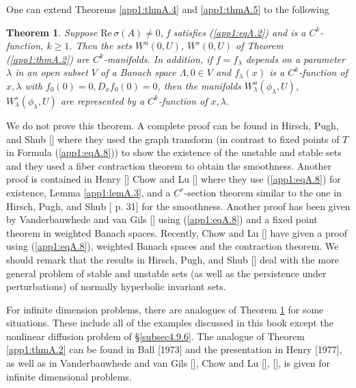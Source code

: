 \documentclass{surv-l}
\theoremstyle{plain}
\newtheorem{theorem}{Theorem}[section]
\theoremstyle{definition}
\numberwithin{equation}{section}
\numberwithin{figure}{chapter}
\begin{document}
One can extend Theorems \ref{app1:thmA.4} and \ref{app1:thmA.5} to the following

\begin{theorem}\label{app1:thmA.6}
Suppose $\mathrm{Re}\,\sigma(A)\neq 0$, f satisfies \emph{(\ref{app1:eqA.2})} and is a $C^{k}$-function, $k\geq 1$. Then the sets $W^{u}(0, U)$, $W^{s}(0, U)$ of Theorem \emph{(\ref{app1:thmA.2})} are $C^{k}$-manifolds. In addition, if $f=f_{\lambda}$ depends on a parameter $\lambda$ in an open subset $V$ of a Banach space $\Lambda, 0\in V$ and $f_{\lambda}(x)$ is a $C^{k}$-function of $x,\lambda$ with $f_{0}(0)=0,D_{x}f_{0}(0)=0$, then the manifolds $W_{\lambda}^{u}(\phi_{\lambda}, U)$, $W_{\lambda}^{s}(\phi_{\lambda}, U)$ are represented by a $C^{k}$-function of $x,\lambda$.
\end{theorem}

We do not prove this theorem. A complete proof can be found in Hirsch, Pugh, and Shub [\citeyear{1977hps}] where they used the graph transform (in contrast to fixed points of $T$ in Formula (\ref{app1:eqA.8})) to show the existence of the unstable and stable sets and they used a fiber contraction theorem to obtain the smoothness. Another proof is contained in Henry [\citeyear{1983h}] Chow and Lu [\citeyear{1988acl}] where they use (\ref{app1:eqA.8}) for existence, Lemma \ref{app1:lemA.3}, and a $C^{r}$-section theorem similar to the one in Hirsch, Pugh, and Shub [\citeyear{1977hps} p. 31] for the smoothness. Another proof has been given by Vanderbauwhede and van Gils [\citeyear{1987vv}] using (\ref{app1:eqA.8}) and a fixed point theorem in weighted Banach spaces. Recently, Chow and Lu [\citeyear{1988bcl}] have given a proof using (\ref{app1:eqA.8}), weighted Banach spaces and the contraction theorem. We should remark that the results in Hirsch, Pugh, and Shub [\citeyear{1977hps}] deal with the more general problem of stable and unstable sets (as well as the persistence under perturbations) of normally hyperbolic invariant sets.


For infinite dimension problems, there are analogues of Theorem \ref{app1:thmA.6} for some situations. These include all of the examples discussed in this book except the nonlinear diffusion problem of \S \ref{subsec4.9.6}. The analogue of Theorem \ref{app1:thmA.2} can be found in Ball [1973] and the presentation in Henry [1977], as well as in Vanderbauwhede and van Gils [\citeyear{1987vv}], Chow and Lu [\citeyear{1988acl}], [\citeyear{1988bcl}], is given for infinite dimensional problems.
\end{document}
